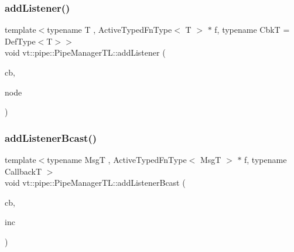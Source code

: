 \subsubsection{\texorpdfstring{add\+Listener()}{addListener()}\hspace{0.1cm}{\footnotesize\ttfamily [2/2]}}
{\footnotesize\ttfamily template$<$typename T , Active\+Typed\+Fn\+Type$<$ T $>$ $\ast$ f, typename CbkT  = Def\+Type$<$\+T$>$$>$ \\
void vt\+::pipe\+::\+Pipe\+Manager\+T\+L\+::add\+Listener (\begin{DoxyParamCaption}\item[{CbkT const \&}]{cb,  }\item[{\hyperlink{namespacevt_a866da9d0efc19c0a1ce79e9e492f47e2}{Node\+Type} const \&}]{node }\end{DoxyParamCaption})}

\mbox{\label{structvt_1_1pipe_1_1_pipe_manager_t_l_a371e41dfb29c097dcf45fa2ae91cbf02}} 
\subsubsection{\texorpdfstring{add\+Listener\+Bcast()}{addListenerBcast()}\hspace{0.1cm}{\footnotesize\ttfamily [1/2]}}
{\footnotesize\ttfamily template$<$typename MsgT , Active\+Typed\+Fn\+Type$<$ Msg\+T $>$ $\ast$ f, typename CallbackT $>$ \\
void vt\+::pipe\+::\+Pipe\+Manager\+T\+L\+::add\+Listener\+Bcast (\begin{DoxyParamCaption}\item[{CallbackT const \&}]{cb,  }\item[{bool const \&}]{inc }\end{DoxyParamCaption})}

\mbox{\label{structvt_1_1pipe_1_1_pipe_manager_t_l_abf50654cc9c8823790a0bb8fe0d0024f}} 
